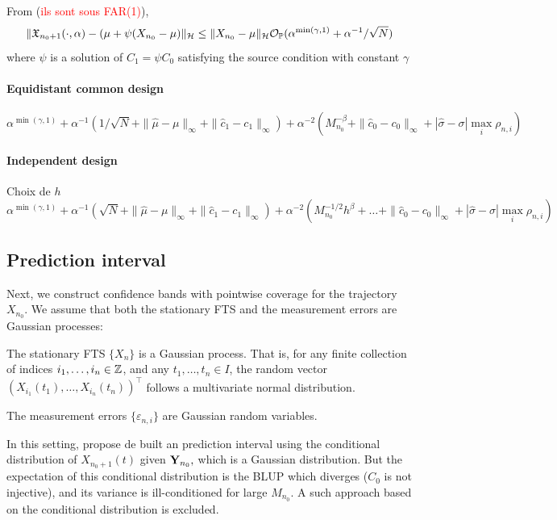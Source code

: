 \documentclass{article}
\begin{document}
From \cite{zhao2026functional} (\textcolor{red}{ils sont sous FAR(1)}),
$$
\|\mathfrak{X}_{n_0+1}(\cdot,\alpha) - (\mu+\psi(X_{n_0}-\mu)\|_{\mathcal{H}} \leq \|X_{n_0}-\mu\|_{\mathcal{H}} \mathcal{O}_{\mathbb{P}}(\alpha^{\min(\gamma,1)}+ \alpha^{-1}/\sqrt{N})  
$$
where $\psi$ is a solution of $C_1=\psi C_0$ satisfying the source condition with constant $\gamma$

\paragraph{Equidistant common design}
$$
\alpha^{\min(\gamma,1)}+ \alpha^{-1}(1/\sqrt{N}+\|\widehat{\mu}-\mu\|_\infty+\|\widehat{c}_1-c_1\|_\infty) + \alpha^{-2}(M_{n_0}^{-\beta} +\|\widehat{c}_0-c_0\|_\infty + |\widehat{\sigma}-\sigma| \max_{i}\rho_{n,i} )
$$

\paragraph{Independent design} Choix de $h$
$$
\alpha^{\min(\gamma,1)}+ \alpha^{-1}(\sqrt{N}+\|\widehat{\mu}-\mu\|_\infty+\|\widehat{c}_1-c_1\|_\infty) + \alpha^{-2}(M_{n_0}^{-1/2}h^\beta+\ldots +\|\widehat{c}_0-c_0\|_\infty + |\widehat{\sigma}-\sigma| \max_{i}\rho_{n,i} )
$$


\subsection{Prediction interval}

Next, we construct confidence bands with pointwise coverage for the trajectory $X_{n_0}$. We assume that both the stationary FTS and the measurement errors are Gaussian processes:
\begin{assumptionH}
	\item\label{H:chap3:gaussian_assumption_FTS} The stationary FTS $\{X_n\}$ is a Gaussian process. That is, for any finite collection of indices $i_1, \ldots, i_n \in \mathbb{Z}$, and any $t_1, \ldots, t_n \in I$, the random vector $( X_{i_1}(t_1), \ldots, X_{i_n}(t_n))^\top$ follows a multivariate normal distribution.
	\item\label{H:chap3:gaussian_assumption_error} The measurement errors $\{\varepsilon_{n,i}\}$ are Gaussian random variables.
\end{assumptionH}

In this setting, \citet{rubin2020sparsely} propose de built an prediction interval using the conditional distribution of $X_{n_0+1}(t)$ given $\mathbf{Y}_{n_0},$ which is a Gaussian distribution.
But the expectation of this conditional distribution is the BLUP which diverges ($C_0$ is not injective), and its variance is ill-conditioned for large $M_{n_0}.$
A such approach based on the conditional distribution is excluded.
\end{document}
